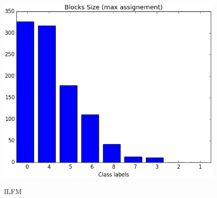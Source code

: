 \documentclass[a4paper, 12pt]{article}
\begin{document}
\begin{figure}[ht]
	\endminipage
	\includegraphics[scale=0.27]{img/M_g_regular/figure_5}
	\endminipage

    \vspace{0.2cm}
	 ILFM


\end{figure}
\end{document}
